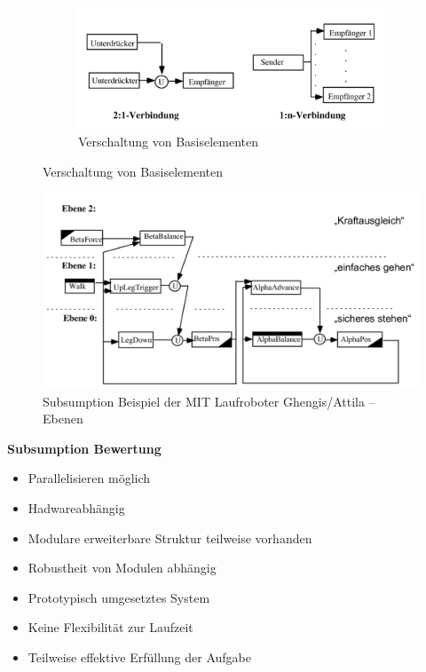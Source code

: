 \begin{figure}
\begin{subfigure}{.5\textwidth}
	\end{subfigure}
	\begin{subfigure}{.5\textwidth}
		\centering
		\includegraphics[width=\textwidth]{figures/verschaltung_basiselement.png}
		\caption{Verschaltung von Basiselementen}
	\end{subfigure}
\end{figure}

\begin{figure}
	\includegraphics[width=\textwidth]{figures/subsumption_beispiel.png}
	\caption{Subsumption Beispiel der MIT Laufroboter Ghengis/Attila -- Ebenen}
\end{figure}

\textbf{Subsumption Bewertung}
\begin{itemize}
	\item Parallelisieren möglich
	\item Hadwareabhängig
	\item Modulare erweiterbare Struktur teilweise vorhanden
	\item Robustheit von Modulen abhängig
	\item Prototypisch umgesetztes System
	\item Keine Flexibilität zur Laufzeit
	\item Teilweise effektive Erfüllung der Aufgabe
\end{itemize}

